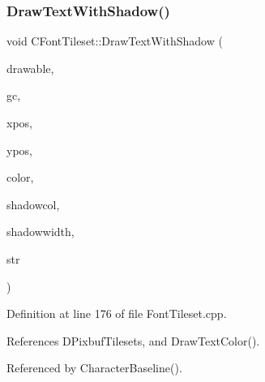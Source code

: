 \subsubsection{\texorpdfstring{Draw\+Text\+With\+Shadow()}{DrawTextWithShadow()}}
{\footnotesize\ttfamily void C\+Font\+Tileset\+::\+Draw\+Text\+With\+Shadow (\begin{DoxyParamCaption}\item[{Gdk\+Drawable $\ast$}]{drawable,  }\item[{Gdk\+GC $\ast$}]{gc,  }\item[{gint}]{xpos,  }\item[{gint}]{ypos,  }\item[{int}]{color,  }\item[{int}]{shadowcol,  }\item[{int}]{shadowwidth,  }\item[{const std\+::string \&}]{str }\end{DoxyParamCaption})}



Definition at line 176 of file Font\+Tileset.\+cpp.



References D\+Pixbuf\+Tilesets, and Draw\+Text\+Color().



Referenced by Character\+Baseline().


